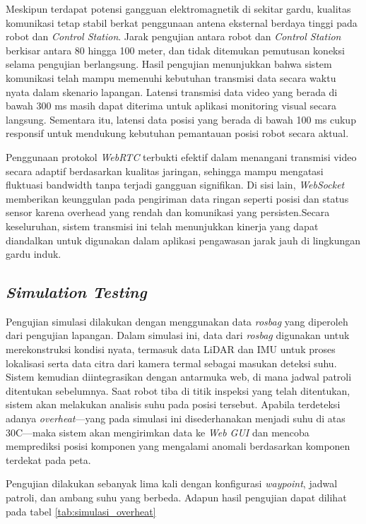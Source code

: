 Meskipun terdapat potensi gangguan elektromagnetik di sekitar gardu, kualitas komunikasi tetap stabil berkat penggunaan antena eksternal berdaya tinggi pada robot dan \emph{Control Station}. Jarak pengujian antara robot dan \emph{Control Station} berkisar antara 80 hingga 100 meter, dan tidak ditemukan pemutusan koneksi selama pengujian berlangsung. Hasil pengujian menunjukkan bahwa sistem komunikasi telah mampu memenuhi kebutuhan transmisi data secara waktu nyata dalam skenario lapangan. Latensi transmisi data video yang berada di bawah 300 ms masih dapat diterima untuk aplikasi monitoring visual secara langsung. Sementara itu, latensi data posisi yang berada di bawah 100 ms cukup responsif untuk mendukung kebutuhan pemantauan posisi robot secara aktual.

Penggunaan protokol \emph{WebRTC} terbukti efektif dalam menangani transmisi video secara adaptif berdasarkan kualitas jaringan, sehingga mampu mengatasi fluktuasi bandwidth tanpa terjadi gangguan signifikan. Di sisi lain, \emph{WebSocket} memberikan keunggulan pada pengiriman data ringan seperti posisi dan status sensor karena overhead yang rendah dan komunikasi yang persisten.Secara keseluruhan, sistem transmisi ini telah menunjukkan kinerja yang dapat diandalkan untuk digunakan dalam aplikasi pengawasan jarak jauh di lingkungan gardu induk.


\subsection{\emph{Simulation Testing}}

Pengujian simulasi dilakukan dengan menggunakan data \emph{rosbag} yang diperoleh dari pengujian lapangan. Dalam simulasi ini, data dari \emph{rosbag} digunakan untuk merekonstruksi kondisi nyata, termasuk data LiDAR dan IMU untuk proses lokalisasi serta data citra dari kamera termal sebagai masukan deteksi suhu. Sistem kemudian diintegrasikan dengan antarmuka web, di mana jadwal patroli ditentukan sebelumnya. Saat robot tiba di titik inspeksi yang telah ditentukan, sistem akan melakukan analisis suhu pada posisi tersebut. Apabila terdeteksi adanya \emph{overheat}—yang pada simulasi ini disederhanakan menjadi suhu di atas 30\textdegree C—maka sistem akan mengirimkan data ke \emph{Web GUI} dan mencoba memprediksi posisi komponen yang mengalami anomali berdasarkan komponen terdekat pada peta.

Pengujian dilakukan sebanyak lima kali dengan konfigurasi \emph{waypoint}, jadwal patroli, dan ambang suhu yang berbeda. Adapun hasil pengujian dapat dilihat pada tabel \ref{tab:simulasi_overheat}


